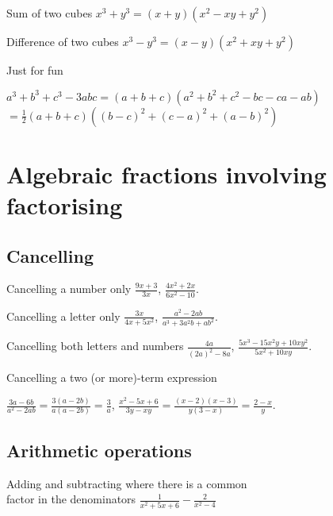 \documentclass{article}
\begin{document}
Sum of two cubes \hfill \(x^3 + y^3 = (x+y)(x^2 - xy + y^2)\)

Difference of two cubes \hfill \(x^3 - y^3 = (x-y)(x^2 + xy + y^2)\)

Just for fun
\vspace{-1.2cm}
\begin{flushright}
\(a^3 + b^3 + c^3 - 3abc = (a+b+c)(a^2 + b^2 + c^2 - bc - ca - ab)\) \\
\(= \frac{1}{2}\left(  a+b+c \right)  \left( (b-c)^2 + (c-a)^2 + (a-b)^2 \right) \)
\end{flushright}



\section{Algebraic fractions involving factorising}

\subsection{Cancelling}

Cancelling a number only \hfill \(\frac{9x+3}{3x}\), \(\frac{4x^2 + 2x}{6x^2 - 10}\).

Cancelling a letter only \hfill \(\frac{3x}{4x+5x^2}\), \(\frac{a^2 - 2ab}{a^3 + 3a^2b + ab^2}\).

Cancelling both letters and numbers \hfill \(\frac{4a}{(2a)^2 - 8a}\), \(\frac{5x^3 - 15x^2y + 10xy^2}{5x^2 + 10xy}\).

Cancelling a two (or more)-term expression
\vspace{-0.5cm}
\begin{flushright}
\(\frac{3a-6b}{a^2-2ab} = \frac{3(a-2b)}{a(a-2b)} = \frac{3}{a}\), \(\frac{x^2 - 5x + 6}{3y - xy} = \frac{(x-2)(x-3)}{y(3-x)} = \frac{2-x}{y}\).
\end{flushright}

\subsection{Arithmetic operations}

Adding and subtracting where there is a common\\ factor in the denominators \hfill
\(\frac{1}{x^2 + 5x +6} - \frac{2}{x^2 - 4}\)
\end{document}
